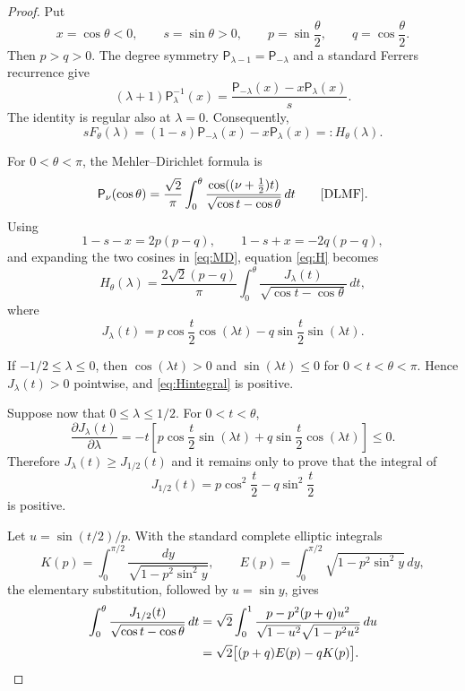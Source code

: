 \documentclass[11pt]{article}
\newcommand{\PP}{\mathsf P}
\begin{document}
\begin{proof}
Put
\[
 x=\cos\theta<0,\qquad s=\sin\theta>0,
 \qquad p=\sin\frac\theta2,\qquad q=\cos\frac\theta2.
\]
Then $p>q>0$.  The degree symmetry $\PP_{\lambda-1}=\PP_{-\lambda}$ and a
standard Ferrers recurrence give
\begin{equation}\label{eq:recurrence}
 (\lambda+1)\PP_\lambda^{-1}(x)
 =\frac{\PP_{-\lambda}(x)-x\PP_\lambda(x)}{s}.
\end{equation}
The identity is regular also at $\lambda=0$.  Consequently,
\begin{equation}\label{eq:H}
 sF_\theta(\lambda)
 =(1-s)\PP_{-\lambda}(x)-x\PP_\lambda(x)
 =:H_\theta(\lambda).
\end{equation}

For $0<\theta<\pi$, the Mehler--Dirichlet formula is
\begin{equation}\label{eq:MD}
 \PP_\nu(\cos\theta)
 =\frac{\sqrt2}{\pi}\int_0^\theta
 \frac{\cos((\nu+\tfrac12)t)}
 {\sqrt{\cos t-\cos\theta}}\,dt
 \qquad\text{\cite[Eq.~14.12.1]{DLMF}}.
\end{equation}
Using
\[
 1-s-x=2p(p-q),\qquad 1-s+x=-2q(p-q),
\]
and expanding the two cosines in \eqref{eq:MD}, equation \eqref{eq:H}
becomes
\begin{equation}\label{eq:Hintegral}
 H_\theta(\lambda)=\frac{2\sqrt2(p-q)}{\pi}
 \int_0^\theta
 \frac{J_\lambda(t)}{\sqrt{\cos t-\cos\theta}}\,dt,
\end{equation}
where
\begin{equation}\label{eq:J}
 J_\lambda(t)=
 p\cos\frac t2\cos(\lambda t)
 -q\sin\frac t2\sin(\lambda t).
\end{equation}

If $-1/2\le\lambda\le0$, then
$\cos(\lambda t)>0$ and $\sin(\lambda t)\le0$ for $0<t<\theta<\pi$.
Hence $J_\lambda(t)>0$ pointwise, and \eqref{eq:Hintegral} is positive.

Suppose now that $0\le\lambda\le1/2$.  For $0<t<\theta$,
\begin{equation}\label{eq:monotone}
 \frac{\partial J_\lambda(t)}{\partial\lambda}
 =-t\left[
 p\cos\frac t2\sin(\lambda t)
 +q\sin\frac t2\cos(\lambda t)
 \right]\le0.
\end{equation}
Therefore $J_\lambda(t)\ge J_{1/2}(t)$ and it remains only to prove that the
integral of
\[
 J_{1/2}(t)=p\cos^2\frac t2-q\sin^2\frac t2
\]
is positive.

Let $u=\sin(t/2)/p$.  With the standard complete elliptic integrals
\[
 K(p)=\int_0^{\pi/2}\frac{dy}{\sqrt{1-p^2\sin^2y}},
 \qquad
 E(p)=\int_0^{\pi/2}\sqrt{1-p^2\sin^2y}\,dy,
\]
the elementary substitution, followed by $u=\sin y$, gives
\begin{align}
 \int_0^\theta\frac{J_{1/2}(t)}
 {\sqrt{\cos t-\cos\theta}}\,dt
 &=\sqrt2\int_0^1
 \frac{p-p^2(p+q)u^2}
 {\sqrt{1-u^2}\sqrt{1-p^2u^2}}\,du \notag\\
 &=\sqrt2\big[(p+q)E(p)-qK(p)\big]. \label{eq:elliptic}
\end{align}


\end{proof}
\end{document}
